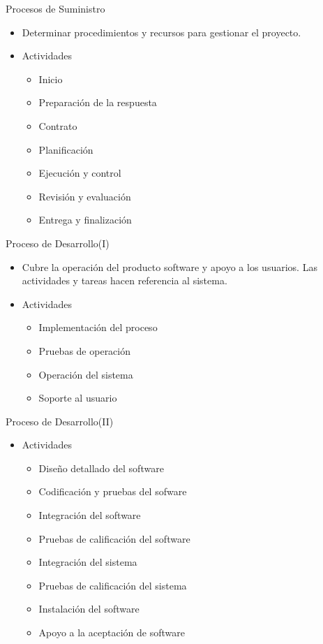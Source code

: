 \documentclass{beamer}
\begin{document}
			\begin{frame}{Procesos de Suministro}
			\begin{itemize}
			\item Determinar procedimientos y recursos para gestionar el proyecto.
			\item Actividades
			
			\begin{itemize}
			\item Inicio
			\item Preparación de la respuesta
			\item Contrato
			\item Planificación
			\item Ejecución y control
			\item Revisión y evaluación
			\item Entrega y finalización
			\end{itemize}
			\end{itemize}

			\end{frame}
			
			\begin{frame}{Proceso de Desarrollo(I)}
			\begin{itemize}
			\item Cubre la operación del producto software y apoyo a los usuarios. Las actividades y tareas hacen referencia al sistema.
			\item Actividades
			
			\begin{itemize}
			\item Implementación del proceso
			\item Pruebas de operación
			\item Operación del sistema
			\item Soporte al usuario
			\end{itemize}

			\end{itemize}
			\end{frame}
			
			
			\begin{frame}{Proceso de Desarrollo(II)}
			\begin{itemize}
			\item Actividades
			
			\begin{itemize}
		 	\item Diseño detallado del software
			\item Codificación y pruebas del sofware
			\item Integración del software
			\item Pruebas de calificación del software
			\item Integración del sistema
			\item Pruebas de calificación del sistema
			\item Instalación del software
			\item Apoyo a la aceptación de software
			\end{itemize}

			\end{itemize}
			\end{frame}
			
\end{document}
